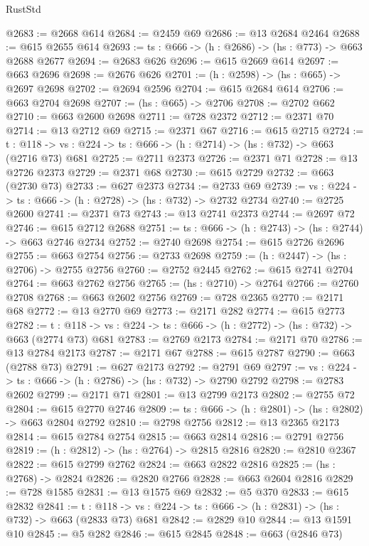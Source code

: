 \begin{lexlean}{RustStd}
\begin{coremodule}
{\begin{coremodule}
{{{{{{{@2683 := @2668 @614
@2684 := @2459 @69
@2686 := @13 @2684 @2464
@2688 := @615 @2655 @614
@2693 := {ts : @666} -> (h : @2686) -> (hs : @773) -> @663 @2688 @2677
@2694 := @2683 @626
@2696 := @615 @2669 @614
@2697 := @663 @2696
@2698 := @2676 @626
@2701 := (h : @2598) -> (hs : @665) -> @2697 @2698
@2702 := @2694 @2596
@2704 := @615 @2684 @614
@2706 := @663 @2704 @2698
@2707 := (hs : @665) -> @2706
@2708 := @2702 @662
@2710 := @663 @2600 @2698
@2711 := @728 @2372
@2712 := @2371 @70
@2714 := @13 @2712 @69
@2715 := @2371 @67
@2716 := @615 @2715
@2724 := {t : @118} ->
  {vs : @224} -> {ts : @666} -> (h : @2714) -> (hs : @732) -> @663 (@2716 @73) @681
@2725 := @2711 @2373
@2726 := @2371 @71
@2728 := @13 @2726 @2373
@2729 := @2371 @68
@2730 := @615 @2729
@2732 := @663 (@2730 @73)
@2733 := @627 @2373
@2734 := @2733 @69
@2739 := {vs : @224} -> {ts : @666} -> (h : @2728) -> (hs : @732) -> @2732 @2734
@2740 := @2725 @2600
@2741 := @2371 @73
@2743 := @13 @2741 @2373
@2744 := @2697 @72
@2746 := @615 @2712 @2688
@2751 := {ts : @666} -> (h : @2743) -> (hs : @2744) -> @663 @2746 @2734
@2752 := @2740 @2698
@2754 := @615 @2726 @2696
@2755 := @663 @2754
@2756 := @2733 @2698
@2759 := (h : @2447) -> (hs : @2706) -> @2755 @2756
@2760 := @2752 @2445
@2762 := @615 @2741 @2704
@2764 := @663 @2762 @2756
@2765 := (hs : @2710) -> @2764
@2766 := @2760 @2708
@2768 := @663 @2602 @2756
@2769 := @728 @2365
@2770 := @2171 @68
@2772 := @13 @2770 @69
@2773 := @2171 @282
@2774 := @615 @2773
@2782 := {t : @118} ->
  {vs : @224} -> {ts : @666} -> (h : @2772) -> (hs : @732) -> @663 (@2774 @73) @681
@2783 := @2769 @2173
@2784 := @2171 @70
@2786 := @13 @2784 @2173
@2787 := @2171 @67
@2788 := @615 @2787
@2790 := @663 (@2788 @73)
@2791 := @627 @2173
@2792 := @2791 @69
@2797 := {vs : @224} -> {ts : @666} -> (h : @2786) -> (hs : @732) -> @2790 @2792
@2798 := @2783 @2602
@2799 := @2171 @71
@2801 := @13 @2799 @2173
@2802 := @2755 @72
@2804 := @615 @2770 @2746
@2809 := {ts : @666} -> (h : @2801) -> (hs : @2802) -> @663 @2804 @2792
@2810 := @2798 @2756
@2812 := @13 @2365 @2173
@2814 := @615 @2784 @2754
@2815 := @663 @2814
@2816 := @2791 @2756
@2819 := (h : @2812) -> (hs : @2764) -> @2815 @2816
@2820 := @2810 @2367
@2822 := @615 @2799 @2762
@2824 := @663 @2822 @2816
@2825 := (hs : @2768) -> @2824
@2826 := @2820 @2766
@2828 := @663 @2604 @2816
@2829 := @728 @1585
@2831 := @13 @1575 @69
@2832 := @5 @370
@2833 := @615 @2832
@2841 := {t : @118} ->
  {vs : @224} -> {ts : @666} -> (h : @2831) -> (hs : @732) -> @663 (@2833 @73) @681
@2842 := @2829 @10
@2844 := @13 @1591 @10
@2845 := @5 @282
@2846 := @615 @2845
@2848 := @663 (@2846 @73)
}}}}}}}
\end{coremodule}}
\end{coremodule}
\end{lexlean}
